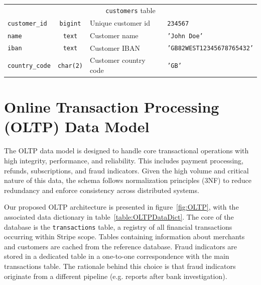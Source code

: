 \documentclass[11pt,a4paper,computermodern]{article}
\newcommand{\code}{\texttt}
\begin{document}
\begin{table}[!htb]
\begin{threeparttable}
\begin{tabularx}{0.99\textwidth}{l c >{\arraybackslash}X >{\arraybackslash}X}
			\midrule
			\multicolumn{4}{c}{\code{customers} table}\\
			\code{customer\_id} & \code{bigint} & Unique customer id & \code{234567} \\
			\code{name} & \code{text} & Customer name & \code{'John Doe'} \\
			\code{iban} & \code{text} & Customer IBAN & \code{'GB82WEST12345678765432'} \\
			\code{country\_code} & \code{char(2)} & Customer country code  & \code{'GB'} \\
			
			\bottomrule
		\end{tabularx}
	\end{threeparttable}
\end{table}


\clearpage
\section*{Online Transaction Processing (OLTP) Data Model}

The OLTP data model is designed to handle core transactional operations with high integrity, performance, and reliability. This includes payment processing, refunds, subscriptions, and fraud indicators. Given the high volume and critical nature of this data, the schema follows normalization principles (3NF) to reduce redundancy and enforce consistency across distributed systems.

Our proposed OLTP architecture is presented in figure~\ref{fig:OLTP}, with the associated data dictionary in table~\ref{table:OLTPDataDict}. The core of the database is the \code{transactions} table, a registry of all financial transactions occurring within Stripe scope. Tables containing information about merchants and customers are cached from the reference database. Fraud indicators are stored in a dedicated table in a one-to-one correspondence with the main transactions table. The rationale behind this choice is that fraud indicators originate from a different pipeline (e.g. reports after bank investigation).
\end{document}
